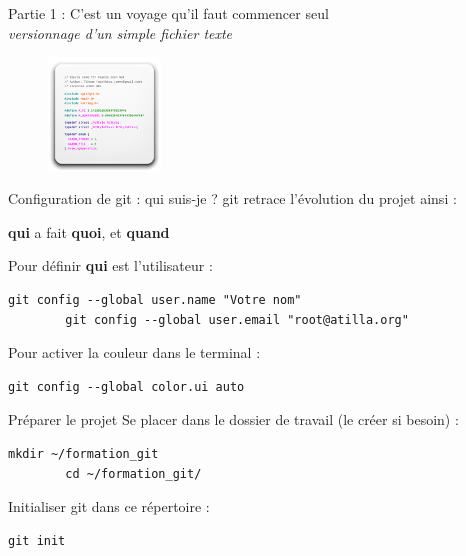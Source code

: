 \documentclass{beamer}
\begin{document}
\begin{frame}
	\begin{center}
 		\Large{Partie 1 : C'est un voyage qu'il faut commencer seul}\\
 		{\small  \textit{versionnage d'un simple fichier texte}}
	\end{center}

	\begin{figure}
		\centering
		\includegraphics[height=3cm]{img/source}
	\end{figure}
\end{frame}

\begin{frame}[fragile]{Configuration de git : qui suis-je ?}
	git retrace l'évolution du projet ainsi :
	\begin{center}
		\textbf{qui} a fait \textbf{quoi}, et \textbf{quand}
	\end{center}
	
	Pour définir \textbf{qui} est l'utilisateur :
	\begin{lstlisting}[frame=single]
		git config --global user.name "Votre nom"
		git config --global user.email "root@atilla.org"
	\end{lstlisting}
	
	Pour activer la couleur dans le terminal :
	\begin{lstlisting}[frame=single]
		git config --global color.ui auto
	\end{lstlisting}
	

\end{frame}

\begin{frame}[fragile]{Préparer le projet}
	Se placer dans le dossier de travail (le créer si besoin) :
	\begin{lstlisting}[frame=single]
		mkdir ~/formation_git
		cd ~/formation_git/
	\end{lstlisting}
	
	Initialiser git dans ce répertoire :
	\begin{lstlisting}[frame=single]
		git init
	\end{lstlisting}
\end{frame}
\end{document}
